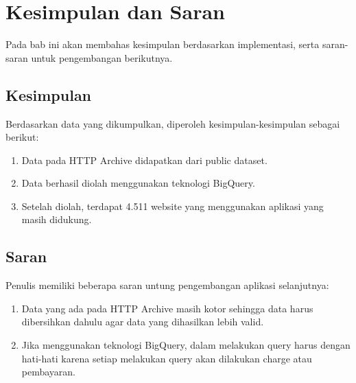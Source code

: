 \chapter{Kesimpulan dan Saran}
\label{chap:kesimpulan_dan_saran}

Pada bab ini akan membahas kesimpulan berdasarkan implementasi, serta saran-saran untuk pengembangan berikutnya.

\section{Kesimpulan}
Berdasarkan data yang dikumpulkan, diperoleh kesimpulan-kesimpulan sebagai berikut:
\begin{enumerate}
	\item Data pada HTTP Archive didapatkan dari public dataset.
	\item Data berhasil diolah menggunakan teknologi BigQuery.
	\item Setelah diolah, terdapat 4.511 website yang menggunakan aplikasi yang masih didukung.
\end{enumerate}

\section{Saran}
Penulis memiliki beberapa saran untung pengembangan aplikasi selanjutnya:
\begin{enumerate}
	\item Data yang ada pada HTTP Archive masih kotor sehingga data harus dibersihkan dahulu agar data yang dihasilkan lebih valid.
	\item Jika menggunakan teknologi BigQuery, dalam melakukan query harus dengan hati-hati karena setiap melakukan query akan dilakukan charge atau pembayaran.
\end{enumerate}